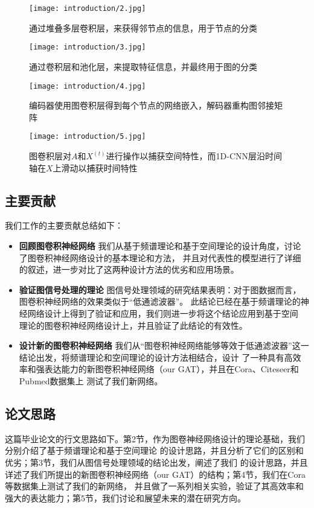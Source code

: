 \begin{figure}[htbp]
    \centering
    \begin{minipage}[t]{0.48\textwidth}
    \centering
    \captionsetup{width=5cm}
    \texttt{[image: introduction/2.jpg]}
    \caption{\label{1-2}通过堆叠多层卷积层，来获得邻节点的信息，用于节点的分类}
    \end{minipage}
    \begin{minipage}[t]{0.48\textwidth}
    \centering
    \captionsetup{width=5cm}
    \texttt{[image: introduction/3.jpg]}
    \caption{\label{1-3}通过卷积层和池化层，来提取特征信息，并最终用于图的分类}
    \end{minipage}
\end{figure}
\begin{figure}[htbp]
    \centering
    \begin{minipage}[t]{0.48\textwidth}
    \centering
    \captionsetup{width=5cm}
    \texttt{[image: introduction/4.jpg]}
    \caption{\label{1-4}编码器使用图卷积层得到每个节点的网络嵌入，解码器重构图邻接矩阵}
    \end{minipage}
    \begin{minipage}[t]{0.48\textwidth}
    \centering
    \captionsetup{width=5cm}
    \texttt{[image: introduction/5.jpg]}
    \caption{\label{1-5}图卷积层对$A$和$X^(t)$进行操作以捕获空间特性，而1D-CNN层沿时间轴在$X$上滑动以捕获时间特性}
    \end{minipage}
\end{figure}

\subsection{主要贡献}
我们工作的主要贡献总结如下：
\begin{itemize}
    \item \textbf{回顾图卷积神经网络} \quad
    我们从基于频谱理论和基于空间理论的设计角度，讨论了图卷积神经网络设计的基本理论和方法，
    并且对代表性的模型进行了详细的叙述，进一步对比了这两种设计方法的优劣和应用场景。

    \item \textbf{验证图信号处理的理论} \quad
    图信号处理领域的研究结果表明：对于图数据而言，图卷积神经网络的效果类似于“低通滤波器”。
    此结论已经在基于频谱理论的神经网络设计上得到了验证和应用，我们则进一步将这个结论应用到基于空间
    理论的图卷积神经网络设计上，并且验证了此结论的有效性。

    \item \textbf{设计新的图卷积神经网络} \quad
    我们从“图卷积神经网络能够等效于低通滤波器”这一结论出发，将频谱理论和空间理论的设计方法相结合，设计
    了一种具有高效率和强表达能力的新图卷积神经网络（our GAT），并且在Cora、Citeseer和Pubmed数据集上
    测试了我们新网络。
\end{itemize}

\subsection{论文思路}
这篇毕业论文的行文思路如下。第2节，作为图卷神经网络设计的理论基础，我们分别介绍了基于频谱理论和基于空间理论
的设计思路，并且分析了它们的区别和优劣；第3节，我们从图信号处理领域的结论出发，阐述了我们
的设计思路，并且详述了我们所提出的新图卷积神经网络（our GAT）的结构；第4节，我们在Cora等数据集上测试了我们的新网络，
并且做了一系列相关实验，验证了其高效率和强大的表达能力；第5节，我们讨论和展望未来的潜在研究方向。